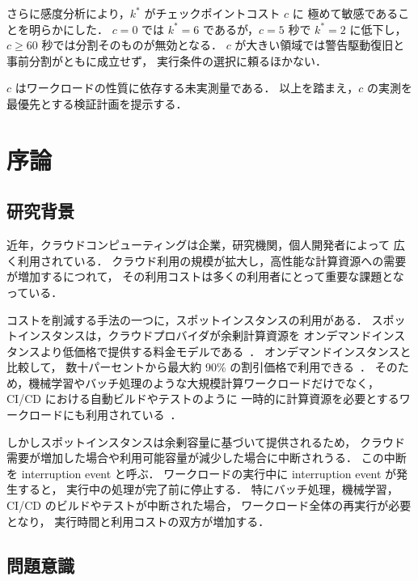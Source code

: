 \documentclass[11pt,a4paper]{ltjsreport}
\begin{document}
さらに感度分析により，$k^{*}$ がチェックポイントコスト $c$ に
極めて敏感であることを明らかにした．
$c = 0$ では $k^{*} = 6$ であるが，$c = 5$ 秒で $k^{*} = 2$ に低下し，
$c \geq 60$ 秒では分割そのものが無効となる．
$c$ が大きい領域では警告駆動復旧と事前分割がともに成立せず，
実行条件の選択に頼るほかない．

$c$ はワークロードの性質に依存する未実測量である．
以上を踏まえ，$c$ の実測を最優先とする検証計画を提示する．

\tableofcontents
\listoffigures
\listoftables

\chapter{序論}

\section{研究背景}

近年，クラウドコンピューティングは企業，研究機関，個人開発者によって
広く利用されている．
クラウド利用の規模が拡大し，高性能な計算資源への需要が増加するにつれて，
その利用コストは多くの利用者にとって重要な課題となっている．

コストを削減する手法の一つに，スポットインスタンスの利用がある．
スポットインスタンスは，クラウドプロバイダが余剰計算資源を
オンデマンドインスタンスより低価格で提供する料金モデルである~\cite{AWSSpot}．
オンデマンドインスタンスと比較して，
数十パーセントから最大約 90\% の割引価格で利用できる~\cite{Lin2022Survey}．
そのため，機械学習やバッチ処理のような大規模計算ワークロードだけでなく，
CI/CD における自動ビルドやテストのように
一時的に計算資源を必要とするワークロードにも利用されている~\cite{Ramesh2025}．

しかしスポットインスタンスは余剰容量に基づいて提供されるため，
クラウド需要が増加した場合や利用可能容量が減少した場合に中断されうる．
この中断を interruption event と呼ぶ．
ワークロードの実行中に interruption event が発生すると，
実行中の処理が完了前に停止する．
特にバッチ処理，機械学習，CI/CD のビルドやテストが中断された場合，
ワークロード全体の再実行が必要となり，
実行時間と利用コストの双方が増加する．

\section{問題意識}
\end{document}
